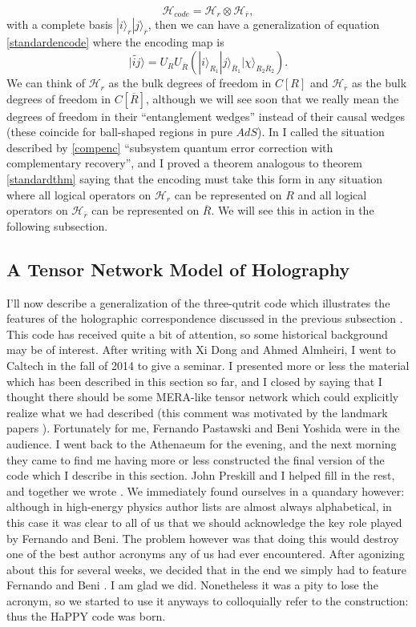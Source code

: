 \documentclass[toc]{PoS}
\newcommand{\be}{\begin{equation}}
\newcommand{\ee}{\end{equation}}
\newcommand{\ran}{\rangle}
\newcommand{\wt}{\widetilde}
\newcommand{\Hc}{\mathcal{H}_{code}}
\newcommand{\ol}{\overline}
\begin{document}
\be
\Hc=\mathcal{H}_r\otimes \mathcal{H}_{\ol{r}},
\ee
with a complete basis $|i\ran_r |j\ran_{\ol{r}}$, then we can have a generalization of equation \eqref{standardencode} where the encoding map is
\be\label{compenc}
|\wt{ij}\ran=U_R U_{\ol{R}}\left(|i\ran_{R_1} |j\ran_{\ol{R}_1}|\chi\ran_{R_2\ol{R}_2}\right).
\ee
We can think of $\mathcal{H}_r$ as the bulk degrees of freedom in $C[R]$ and $\mathcal{H}_{\ol{r}}$ as the bulk degrees of freedom in $C[\ol{R}]$, although we will see soon that we really mean the degrees of freedom in their ``entanglement wedges'' instead of their causal wedges (these coincide for ball-shaped regions in pure $AdS$).  In \cite{Harlow:2016vwg} I called the situation described by \eqref{compenc} ``subsystem quantum error correction with complementary recovery'', and I proved a theorem analogous to theorem \ref{standardthm} saying that the encoding must take this form in any situation where all logical operators on $\mathcal{H}_r$ can be represented on $R$ and all logical operators on $\mathcal{H}_{\ol{r}}$ can be represented on $\ol{R}$.  We will see this in action in the following subsection.  


\subsection{A Tensor Network Model of Holography}
I'll now describe a generalization of the three-qutrit code which illustrates the features of the holographic correspondence discussed in the previous subsection \cite{Pastawski:2015qua}. This code has received quite a bit of attention, so some historical background may be of interest.  After writing \cite{Almheiri:2014lwa} with Xi Dong and Ahmed Almheiri, I went to Caltech in the fall of 2014 to give a seminar.  I presented more or less the material which has been described in this section so far, and I closed by saying that I thought there should be some MERA-like tensor network which could explicitly realize what we had described (this comment was motivated by the landmark papers \cite{Swingle:2009bg,Qi:2013caa}).  Fortunately for me, Fernando Pastawski and Beni Yoshida were in the audience.  I went back to the Athenaeum for the evening, and the next morning they came to find me having more or less constructed the final version of the code which I describe in this section.  John Preskill and I helped fill in the rest, and together we wrote \cite{Pastawski:2015qua}.  We immediately found ourselves in a quandary however: although in high-energy physics author lists are almost always alphabetical, in this case it was clear to all of us that we should acknowledge the key role played by Fernando and Beni.  The problem however was that doing this would destroy one of the best author acronyms any of us had ever encountered.  After agonizing about this for several weeks, we decided that in the end we simply had to feature Fernando and Beni \cite{Pastawski:2015qua}.  I am glad we did.  Nonetheless it was a pity to lose the acronym, so we started to use it anyways to colloquially refer to the construction: thus the HaPPY code was born.
\end{document}
